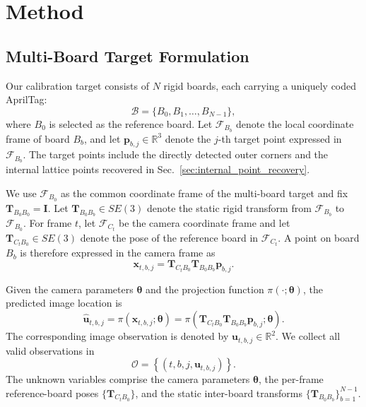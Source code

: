 \documentclass[letterpaper, 10 pt, conference]{ieeeconf}  %
\begin{document}
\section{Method}

\subsection{Multi-Board Target Formulation}

Our calibration target consists of $N$ rigid boards, each carrying a
uniquely coded AprilTag:
\begin{equation}
\mathcal{B}=\{B_0,B_1,\ldots,B_{N-1}\},
\end{equation}
where $B_0$ is selected as the reference board. Let
$\mathcal{F}_{B_b}$ denote the local coordinate frame of board $B_b$,
and let $\mathbf{p}_{b,j}\in\mathbb{R}^3$ denote the $j$-th target point
expressed in $\mathcal{F}_{B_b}$. The target points include the directly
detected outer corners and the internal lattice points recovered in
Sec.~\ref{sec:internal_point_recovery}.

We use $\mathcal{F}_{B_0}$ as the common coordinate frame of the
multi-board target and fix
$\mathbf{T}_{B_0B_0}=\mathbf{I}$.
Let $\mathbf{T}_{B_0B_b}\in SE(3)$ denote the static rigid transform
from $\mathcal{F}_{B_b}$ to $\mathcal{F}_{B_0}$. For frame $t$, let
$\mathcal{F}_{C_t}$ be the camera coordinate frame and let
$\mathbf{T}_{C_tB_0}\in SE(3)$ denote the pose of the reference board
in $\mathcal{F}_{C_t}$. A point on board $B_b$ is therefore
expressed in the camera frame as
\begin{equation}
\mathbf{x}_{t,b,j}
=
\mathbf{T}_{C_tB_0}
\mathbf{T}_{B_0B_b}
\mathbf{p}_{b,j}.
\end{equation}

Given the camera parameters $\boldsymbol{\theta}$ and the projection
function $\pi(\cdot;\boldsymbol{\theta})$, the predicted image
location is
\begin{equation}
\hat{\mathbf{u}}_{t,b,j}
=
\pi\!\left(
\mathbf{x}_{t,b,j};
\boldsymbol{\theta}
\right)
=
\pi\!\left(
\mathbf{T}_{C_tB_0}
\mathbf{T}_{B_0B_b}
\mathbf{p}_{b,j};
\boldsymbol{\theta}
\right).
\end{equation}
The corresponding image observation is denoted by
$\mathbf{u}_{t,b,j}\in\mathbb{R}^2$. We collect all valid
observations in
\begin{equation}
\mathcal{O}
=
\left\{
(t,b,j,\mathbf{u}_{t,b,j})
\right\}.
\end{equation}
The unknown variables comprise the camera parameters
$\boldsymbol{\theta}$, the per-frame reference-board poses
$\{\mathbf{T}_{C_tB_0}\}$, and the static inter-board transforms
$\{\mathbf{T}_{B_0B_b}\}_{b=1}^{N-1}$.
\end{document}
